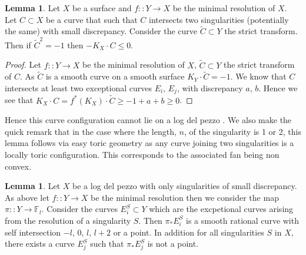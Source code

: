 \documentclass[11pt]{report}
\theoremstyle{definition}
\theoremstyle{definition}
\theoremstyle{definition}
\theoremstyle{definition}
\theoremstyle{definition}
\newtheorem{lem}[thm]{Lemma}
\theoremstyle{definition}
\theoremstyle{definition}
\theoremstyle{definition}
\newcommand{\ldp}{log del pezzo }
\newcommand{\minres}{minimal resolution }
\begin{document}
\begin{lem}
Let $X$ be a surface and  $f \colon : Y \rightarrow X$ be the minimal resolution of $X$. Let $C \subset X$ be a curve that such that $C$ intersects two singularities (potentially the same) with small discrepancy. Consider the curve $\widetilde C \subset Y$ the strict transform. Then if $\widetilde C^2 = -1$ then $-K_X \cdot C \leq 0$.
\end{lem}
\begin{proof}
Let $f \colon : Y \rightarrow X$ be the minimal resolution of $X$, $\widetilde C \subset Y$ the strict transform of $C$. As $\widetilde C$ is a smooth curve on a smooth surface $K_Y \cdot \widetilde C = -1$. We know that $C$ intersects at least two exceptional curves $E_i, \, E_j$, with discrepancy $a, \, b$. Hence we see that $K_X \cdot C = f^*(K_X) \cdot \widetilde C \geq -1 + a + b  \geq 0$. 
\end{proof}
Hence this curve configuration cannot lie on a \ldp. We also make the quick remark that in the case where the length, $n$, of the singularity is 1 or 2, this lemma follows via easy toric geometry as any curve joining two singularities is a locally toric configuration. This corresponds to the associated fan being non convex. 
\begin{lem}
Let $X$ be a \ldp with only singularities of small discrepancy. As above let $f \colon : Y \rightarrow X$ be the \minres then we consider the map $\pi \colon : Y \rightarrow \mathbb{F}_l$. Consider the curves $E_i^S \subset Y$ which are the excpetional curves arising from the resolution of a singularity $S$. Then $\pi_* E_i^S$ is a smooth rational curve with self intersection $-l, \,0, \, l, \, l+2$ or a point. In addition for all singularities $S$ in $X$, there exists a curve $E_j^S$ such that $\pi_* E_j^S$ is not a point.

\end{lem}
\end{document}
